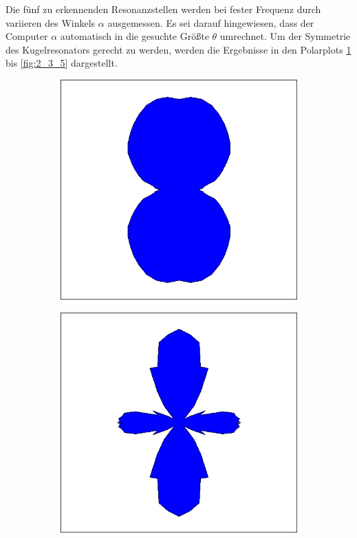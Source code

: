 Die fünf zu erkennenden Resonanzstellen werden bei fester Frequenz durch variieren des Winkels $\alpha$ ausgemessen.
Es sei darauf hingewiesen, dass der Computer $\alpha$ automatisch in die gesuchte Größte $\theta$ umrechnet.
Um der Symmetrie des Kugelresonators gerecht zu werden, werden die Ergebnisse in den Polarplots \ref{fig:2_3_1} bis \ref{fig:2_3_5} dargestellt.
\begin{figure}
\centering
\begin{subfigure}{0.4\textwidth}
\includegraphics[width=\textwidth]{content/messungen/Chapter2new/2_3_1.jpg}
\label{fig:2_3_1}
\end{subfigure}
\begin{subfigure}{0.4\textwidth}
\includegraphics[width=\textwidth]{content/messungen/Chapter2new/2_3_2.jpg}
\label{fig:2_3_2}
\end{subfigure}


\end{figure}
